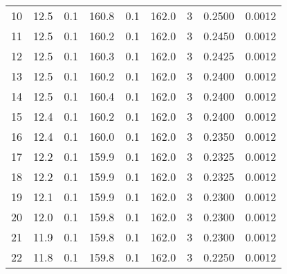 \begin{tabular}{lrrrrrrrr}
	10 & 12.5               & 0.1                       & 160.8            & 0.1                     & 162.0              & 3                         & 0.2500               & 0.0012                      \\
	11 & 12.5               & 0.1                       & 160.2            & 0.1                     & 162.0              & 3                         & 0.2450               & 0.0012                      \\
	12 & 12.5               & 0.1                       & 160.3            & 0.1                     & 162.0              & 3                         & 0.2425               & 0.0012                      \\
	13 & 12.5               & 0.1                       & 160.2            & 0.1                     & 162.0              & 3                         & 0.2400               & 0.0012                      \\
	14 & 12.5               & 0.1                       & 160.4            & 0.1                     & 162.0              & 3                         & 0.2400               & 0.0012                      \\
	15 & 12.4               & 0.1                       & 160.2            & 0.1                     & 162.0              & 3                         & 0.2400               & 0.0012                      \\
	16 & 12.4               & 0.1                       & 160.0            & 0.1                     & 162.0              & 3                         & 0.2350               & 0.0012                      \\
	17 & 12.2               & 0.1                       & 159.9            & 0.1                     & 162.0              & 3                         & 0.2325               & 0.0012                      \\
	18 & 12.2               & 0.1                       & 159.9            & 0.1                     & 162.0              & 3                         & 0.2325               & 0.0012                      \\
	19 & 12.1               & 0.1                       & 159.9            & 0.1                     & 162.0              & 3                         & 0.2300               & 0.0012                      \\
	20 & 12.0               & 0.1                       & 159.8            & 0.1                     & 162.0              & 3                         & 0.2300               & 0.0012                      \\
	21 & 11.9               & 0.1                       & 159.8            & 0.1                     & 162.0              & 3                         & 0.2300               & 0.0012                      \\
	22 & 11.8               & 0.1                       & 159.8            & 0.1                     & 162.0              & 3                         & 0.2250               & 0.0012                      \\
	\bottomrule
\end{tabular}
